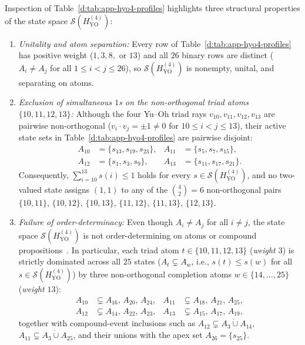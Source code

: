 \documentclass[aps,pra,reprint,superscriptaddress,longbibliography,nofootinbib,floatfix,10pt]{revtex4-2}
\theoremstyle{definition}
\newcommand{\YO}{\mathrm{YO}}
\begin{document}
Inspection of Table~\ref{d:tab:app-hyo4-profiles} highlights three structural properties of the state space $\mathcal{S}(H_{\YO}^{(4)})$:
\begin{enumerate}
\item \emph{Unitality and atom separation:} Every row of Table~\ref{d:tab:app-hyo4-profiles} has positive weight ($1,3,8,$ or $13$) and all $26$ binary rows are distinct ($A_i\ne A_j$ for all $1\le i<j\le 26$), so $\mathcal{S}(H_{\YO}^{(4)})$ is nonempty, unital, and separating on atoms.
\item \emph{Exclusion of simultaneous $1$s on the non-orthogonal triad atoms $\{10,11,12,13\}$:} Although the four Yu--Oh triad rays $v_{10},v_{11},v_{12},v_{13}$ are pairwise non-orthogonal ($v_i\cdot v_j=\pm1\ne0$ for $10\le i<j\le 13$), their active state sets in Table~\ref{d:tab:app-hyo4-profiles} are pairwise disjoint:
\begin{equation}\label{d:eq:hyo4-triad-disjoint}
\begin{aligned}
A_{10}&=\{s_{13},s_{19},s_{23}\},&
A_{11}&=\{s_{5},s_{7},s_{15}\},\\
A_{12}&=\{s_{1},s_{3},s_{9}\},&
A_{13}&=\{s_{11},s_{17},s_{21}\}.
\end{aligned}
\end{equation}
Consequently, $\sum_{i=10}^{13}s(i)\le1$ holds for every $s\in\mathcal{S}(H_{\YO}^{(4)})$, and no two-valued state assigns $(1,1)$ to any of the $\binom{4}{2}=6$ non-orthogonal pairs $\{10,11\}$, $\{10,12\}$, $\{10,13\}$, $\{11,12\}$, $\{11,13\}$, $\{12,13\}$.
\item \emph{Failure of order-determinacy:} Even though $A_i\ne A_j$ for all $i\ne j$, the state space $\mathcal{S}(H_{\YO}^{(4)})$ is not order-determining on atoms or compound propositions~\cite{svozil-tkadlec}. In particular, each triad atom $t\in\{10,11,12,13\}$ (\emph{weight $3$}) is strictly dominated across all $25$ states ($A_t\subsetneq A_w$, i.e., $s(t)\le s(w)$ for all $s\in\mathcal{S}(H_{\YO}^{(4)})$) by three non-orthogonal completion atoms $w\in\{14,\ldots,25\}$ (\emph{weight $13$}):
\begin{equation}\label{d:eq:hyo4-inclusions}
\begin{aligned}
A_{10}&\subsetneq A_{16},\,A_{20},\,A_{24},&
A_{11}&\subsetneq A_{18},\,A_{21},\,A_{25},\\
A_{12}&\subsetneq A_{14},\,A_{22},\,A_{23},&
A_{13}&\subsetneq A_{15},\,A_{17},\,A_{19},
\end{aligned}
\end{equation}
together with compound-event inclusions such as $A_{12}\subsetneq A_3\mathbin{\dot\cup}A_{14}$, $A_{11}\subsetneq A_3\mathbin{\dot\cup}A_{25}$, and their unions with the apex set $A_{26}=\{s_{25}\}$.
\end{enumerate}
\end{document}
